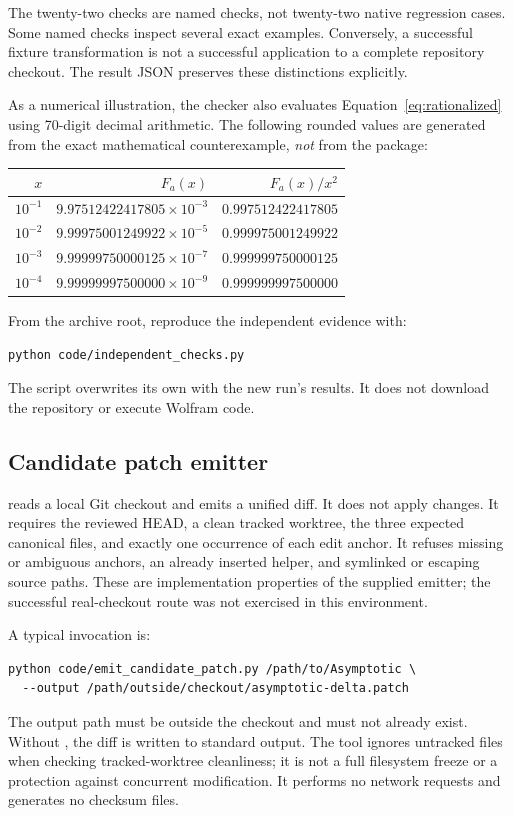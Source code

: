 \documentclass[11pt,letterpaper]{article}
\newcommand{\code}[1]{\texttt{\detokenize{#1}}}
\begin{document}
The twenty-two checks are named checks, not twenty-two native regression cases. Some named checks inspect several exact examples. Conversely, a successful fixture transformation is not a successful application to a complete repository checkout. The result JSON preserves these distinctions explicitly.

As a numerical illustration, the checker also evaluates Equation~\eqref{eq:rationalized} using 70-digit decimal arithmetic. The following rounded values are generated from the exact mathematical counterexample, \emph{not} from the package:
\begin{center}
\begin{tabular}{@{}rrr@{}}
\toprule
$x$ & $F_a(x)$ & $F_a(x)/x^2$\\
\midrule
$10^{-1}$ & $9.97512422417805\times10^{-3}$ & $0.997512422417805$\\
$10^{-2}$ & $9.99975001249922\times10^{-5}$ & $0.999975001249922$\\
$10^{-3}$ & $9.99999750000125\times10^{-7}$ & $0.999999750000125$\\
$10^{-4}$ & $9.99999997500000\times10^{-9}$ & $0.999999997500000$\\
\bottomrule
\end{tabular}
\end{center}

From the archive root, reproduce the independent evidence with:
\begin{lstlisting}
python code/independent_checks.py
\end{lstlisting}
The script overwrites its own  with the new run's results. It does not download the repository or execute Wolfram code.

\subsection{Candidate patch emitter}

 reads a local Git checkout and emits a unified diff. It does not apply changes. It requires the reviewed HEAD, a clean tracked worktree, the three expected canonical files, and exactly one occurrence of each edit anchor. It refuses missing or ambiguous anchors, an already inserted helper, and symlinked or escaping source paths. These are implementation properties of the supplied emitter; the successful real-checkout route was not exercised in this environment.

A typical invocation is:
\begin{lstlisting}
python code/emit_candidate_patch.py /path/to/Asymptotic \
  --output /path/outside/checkout/asymptotic-delta.patch
\end{lstlisting}
The output path must be outside the checkout and must not already exist. Without \code{--output}, the diff is written to standard output. The tool ignores untracked files when checking tracked-worktree cleanliness; it is not a full filesystem freeze or a protection against concurrent modification. It performs no network requests and generates no checksum files.
\end{document}
